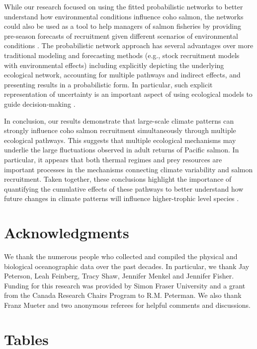 While our research focused on using the fitted probabilistic networks to better
understand how environmental conditions influence coho salmon, the networks
could also be used as a tool to help managers of salmon fisheries by providing
pre-season forecasts of recruitment given different scenarios of environmental
conditions \citep{Nyberg2006a, Araujo2013}. The probabilistic network approach
has several advantages over more traditional modeling and forecasting methods
(e.g., stock recruitment models with environmental effects) including explicitly
depicting the underlying ecological network, accounting for multiple pathways
and indirect effects, and presenting results in a probabilistic form. In
particular, such explicit representation of uncertainty is an important aspect
of using ecological models to guide decision-making \citep{Clark2001a}.

In conclusion, our results demonstrate that large-scale climate patterns can
strongly influence coho salmon recruitment simultaneously through multiple
ecological pathways. This suggests that multiple ecological mechanisms may
underlie the large fluctuations observed in adult returns of Pacific salmon. In
particular, it appears that both thermal regimes and prey resources are
important processes in the mechanisms connecting climate variability and salmon
recruitment. Taken together, these conclusions highlight the importance of
quantifying the cumulative effects of these pathways to better understand how
future changes in climate patterns will influence higher-trophic level species
\citep{Ainsworth2011a, Fulton2011}.



\section{Acknowledgments}

We thank the numerous people who collected and compiled the physical and
biological oceanographic data over the past decades. In particular, we thank Jay
Peterson, Leah Feinberg, Tracy Shaw, Jennifer Menkel and Jennifer Fisher.
Funding for this research was provided by Simon Fraser University and a grant
from the Canada Research Chairs Program to R.M.  Peterman. We also thank Franz
Mueter and two anonymous referees for helpful comments and discussions.



\section{Tables}

